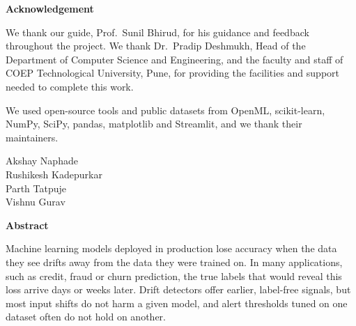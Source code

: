 
\newpage
\begin{center}
\Large \textbf{Acknowledgement}
\end{center}

We thank our guide, Prof.\ Sunil Bhirud, for his guidance and feedback throughout the project. We thank Dr.\ Pradip Deshmukh, Head of the Department of Computer Science and Engineering, and the faculty and staff of COEP Technological University, Pune, for providing the facilities and support needed to complete this work.

We used open-source tools and public datasets from OpenML, scikit-learn, NumPy, SciPy, pandas, matplotlib and Streamlit, and we thank their maintainers.

\vspace{1cm}
\begin{flushright}
Akshay Naphade\\
Rushikesh Kadepurkar\\
Parth Tatpuje\\
Vishnu Gurav
\end{flushright}

\newpage
\begin{center}
\Large \textbf{Abstract}
\end{center}

Machine learning models deployed in production lose accuracy when the data they see drifts away from the data they were trained on. In many applications, such as credit, fraud or churn prediction, the true labels that would reveal this loss arrive days or weeks later. Drift detectors offer earlier, label-free signals, but most input shifts do not harm a given model, and alert thresholds tuned on one dataset often do not hold on another.

